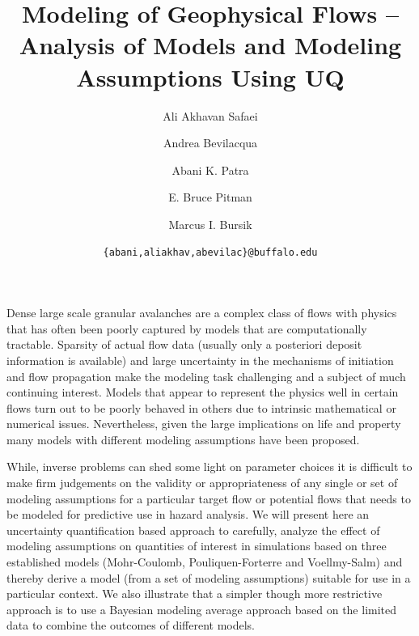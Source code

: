 \documentclass{article}
\begin{document}
\title{\bf Modeling of Geophysical Flows -- Analysis of Models and Modeling Assumptions Using UQ}
\author[1]{Ali Akhavan Safaei}
\author[2]{Andrea Bevilacqua}
\author[1,3]{Abani K. Patra}
\author[4]{E. Bruce Pitman}
\author[2]{Marcus I. Bursik}


\date{\texttt{\{abani,aliakhav,abevilac\}@buffalo.edu}}


\maketitle

\abstract
Dense large scale granular avalanches are a complex class of flows with physics that has often been poorly captured by models that are computationally tractable. Sparsity of actual flow data (usually only a posteriori  deposit information is available) and large uncertainty in the mechanisms of initiation and flow propagation make the modeling task challenging and a subject of much continuing interest. Models that appear to represent the physics well in certain flows turn out to be poorly behaved in others due to intrinsic mathematical or numerical issues. Nevertheless, given the large implications on life and property many models with different modeling assumptions have been proposed.

While, inverse problems can shed some light on parameter choices it is difficult to make firm judgements on the validity or appropriateness of any single or set of modeling assumptions for a particular target flow or potential flows that needs to be modeled for predictive use in hazard analysis. We will present here an uncertainty quantification  based approach to carefully, analyze the effect of modeling assumptions on quantities of interest in simulations based on three established models (Mohr-Coulomb, Pouliquen-Forterre and Voellmy-Salm) and thereby derive a model (from a set of modeling assumptions) suitable for use in a particular context. We also illustrate that a simpler though more restrictive approach is to use a Bayesian modeling average approach based on the limited data to combine the outcomes of different models.
\end{document}
